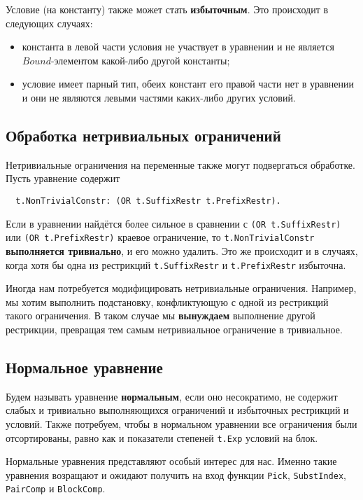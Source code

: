 \documentclass[12pt]{article}
\begin{document}
Условие (на константу) также может стать \textbf{избыточным}. Это происходит в
следующих случаях:
\begin{itemize}
  \item константа в левой части условия не участвует в уравнении и не является
  $Bound$-элементом какой-либо другой константы;
  \item условие имеет парный тип, обеих констант его правой части нет
  в уравнении и они не являются левыми частями каких-либо других условий.
\end{itemize}

\subsection{Обработка нетривиальных ограничений}

Нетривиальные ограничения на переменные также могут подвергаться обработке.
Пусть уравнение содержит
\begin{Verbatim}
  t.NonTrivialConstr: (OR t.SuffixRestr t.PrefixRestr).
\end{Verbatim}
Если в уравнении найдётся более сильное в сравнении с
\texttt{(OR t.SuffixRestr)} или \texttt{(OR t.PrefixRestr)} краевое ограничение,
то \texttt{t.NonTrivialConstr} \textbf{выполняется тривиально}, и его можно
удалить. Это же происходит и в случаях, когда хотя бы одна из рестрикций
\texttt{t.SuffixRestr} и \texttt{t.PrefixRestr} избыточна.

Иногда нам потребуется модифицировать нетривиальные ограничения. Например, мы
хотим выполнить подстановку, конфликтующую с одной из рестрикций такого
ограничения. В таком случае мы \textbf{вынуждаем} выполнение другой рестрикции,
превращая тем самым нетривиальное ограничение в тривиальное.

\subsection{Нормальное уравнение}

Будем называть уравнение \textbf{нормальным}, если оно несократимо, не содержит
слабых и тривиально выполняющихся ограничений и избыточных рестрикций и условий.
Также потребуем, чтобы в нормальном уравнении все ограничения были
отсортированы, равно как и показатели степеней \texttt{t.Exp} условий на блок.

Нормальные уравнения представляют особый интерес для нас. Именно такие уравнения
возращают и ожидают получить на вход функции \texttt{Pick}, \texttt{SubstIndex},
\texttt{PairComp} и \texttt{BlockComp}.
\end{document}

